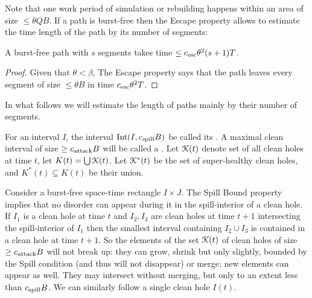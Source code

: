 \documentclass[11pt]{memoir}
\theoremstyle{definition} %
\renewcommand{\le}{\leq}
\renewcommand{\ge}{\geq}
\def\B{B}
\newcommand{\Int}{\mathrm{Int}}
\newcommand{\Q}{Q}
\newcommand{\Tu}{T}
\newcommand{\cns}[1]{c_{\textrm{\upshape #1}}}
\newcommand{\CAtt}{\cns{attack}}
\newcommand{\CEsc}{\cns{esc}}
\newcommand{\CSpill}{\cns{spill}}
\begin{document}
Note that one work period of simulation or rebuilding happens within an
area of size \( \le\theta\Q\B \).
If a path is burst-free then the Escape property allows to estimate the time length of the path
by its number of segments:

\begin{lemma}\label{lem:segment-time}
  A burst-free path with \( s \) segments takes time \( \le \CEsc \theta^{2}(s+1)\Tu \).  
\end{lemma}
\begin{proof}
  Given that \( \theta<\beta \),
  The Escape property says that the path leaves every segment of size \( \le \theta\B \) in
  time \( \CEsc\theta^{2}\Tu \).
\end{proof}

In what follows we will estimate the length of paths mainly by their number of segments.



\begin{definition}
  For an interval \( I \), the interval \( \Int(I,\CSpill\B) \) be called its .
  A maximal clean interval of size \( \ge\CAtt\B \) will be called a .
  Let \( \mathcal{K}(t) \) denote set of all clean holes at time \( t \),
  let \( K(t)=\bigcup \mathcal{K}(t) \).
  Let \( \mathcal{K}^{*}(t) \) be the set of super-healthy clean holes, and \( K^{*}(t)\subseteq K(t) \)
  be their union.
\end{definition}

Consider a burst-free space-time rectangle \( I\times J \).
The Spill Bound property implies that 
no disorder can appear during it in the spill-interior of a clean hole.
If \( I_{1} \) is a clean hole at time \( t \) and \( I_{2}, I_{3} \) are clean holes at time \( t+1 \)
intersecting the spill-interior of \( I_{1} \) then the smallest interval containing \( I_{2}\cup I_{3} \) is
contained in a clean hole at time \( t+1 \).
So the elements of the set \( \mathcal{K}(t) \) of clean holes of size \( \ge\CAtt\B \)
will not break up: they can grow, shrink but only slightly, bounded by the Spill condition
(and thus will not disappear) or merge; new elements can appear as well.
They may intersect without merging, but only to an extent less than \( \CSpill\B \).
We can similarly follow a single clean hole \( I(t) \).
\end{document}
